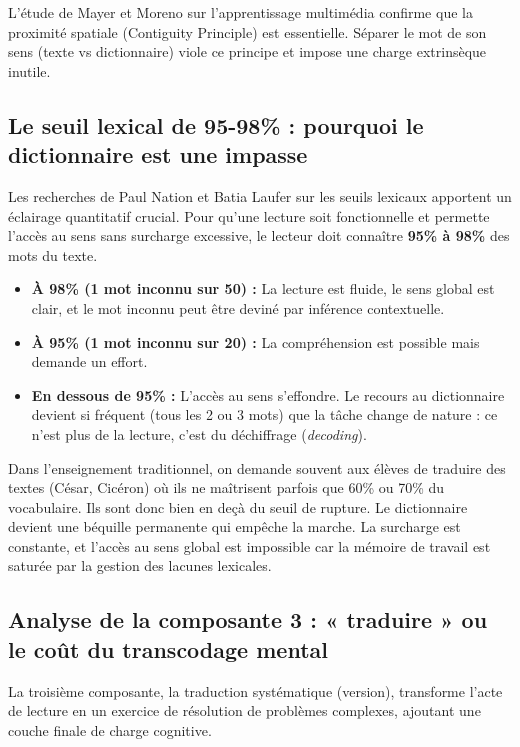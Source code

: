 L'étude de Mayer et Moreno sur l'apprentissage multimédia confirme que la proximité spatiale
(Contiguity Principle) est essentielle. Séparer le mot de son sens (texte vs dictionnaire) viole ce
principe et impose une charge extrinsèque inutile.\cite{II-1-3-ref19}



\subsection{Le seuil lexical de 95-98\% : pourquoi le dictionnaire est une impasse}

Les recherches de Paul Nation et Batia Laufer sur les seuils lexicaux apportent un éclairage
quantitatif crucial. Pour qu'une lecture soit fonctionnelle et permette l'accès au sens sans
surcharge excessive, le lecteur doit connaître \textbf{95\% à 98\%} des mots du
texte.\cite{II-1-3-ref25}

\begin{itemize}\item \textbf{À 98\% (1 mot inconnu sur 50) :} La lecture est fluide, le sens global est clair, et le mot inconnu peut être deviné par inférence contextuelle.\item \textbf{À 95\% (1 mot inconnu sur 20) :} La compréhension est possible mais demande un effort.\item \textbf{En dessous de 95\% :} L'accès au sens s'effondre. Le recours au dictionnaire devient si fréquent (tous les 2 ou 3 mots) que la tâche change de nature : ce n'est plus de la lecture, c'est du déchiffrage (\textit{decoding}).\end{itemize}Dans l'enseignement traditionnel, on demande souvent aux élèves de traduire des textes (César,
Cicéron) où ils ne maîtrisent parfois que 60\% ou 70\% du vocabulaire. Ils sont donc bien en deçà du
\og seuil de rupture\fg{}. Le dictionnaire devient une béquille permanente qui empêche la marche. La
surcharge est constante, et l'accès au sens global est impossible car la mémoire de travail est
saturée par la gestion des lacunes lexicales.\cite{II-1-3-ref28}



\subsection{Analyse de la composante 3 : « traduire » ou le coût du transcodage mental}

La troisième composante, la traduction systématique (version), transforme l'acte de lecture en un
exercice de résolution de problèmes complexes, ajoutant une couche finale de charge cognitive.



